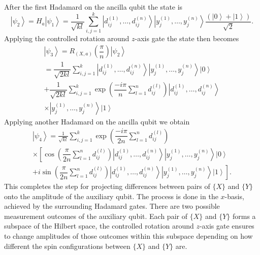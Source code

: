 \documentclass[pra,showkeys,twocolumn,showpacs]{revtex4-1}
\begin{document}
After the first Hadamard on the ancilla qubit the state is
%
\begin{equation}
    \left| \psi_2 \right\rangle = H_a\left| \psi_1 \right\rangle = 
    \frac{1}{\sqrt{kl}}\sum\limits_{i, j=1}^{k} 
    \left| d^{(1)}_{ij}, \dots, d^{(n)}_{ij} \right\rangle 
    \left| y^{(1)}_j, \dots, y^{(n)}_j \right\rangle
    \dfrac{(\left| 0 \right\rangle + \left| 1 \right\rangle)}{\sqrt{2}}  .
\end{equation}
%
Applying the controlled rotation around $z$-axis gate the state then becomes
%
\begin{multline}
    \left| \psi_3 \right\rangle = R_{(X,a)}\left(\dfrac{\pi}{n}\right)\left| \psi_2 \right\rangle
    \\ = \dfrac{1}{\sqrt{2kl}}
				\sum\limits_{i, j=1}^{k} 
				\left| d^{(1)}_{ij}, \dots, d^{(n)}_{ij} \right\rangle 
        \left| y^{(1)}_j, \dots, y^{(n)}_j \right\rangle 
        \left| 0 \right\rangle
        \\ + \dfrac{1}{\sqrt{2kl}}
				\sum\limits_{i, j=1}^{k}
        \exp\left(\dfrac{-i \pi}{n}\sum\limits_{l=1}^n d^{(l)}_{ij} \right)
        \left| d^{(1)}_{ij}, \dots, d^{(n)}_{ij} \right\rangle 
\\ \times        \left| y^{(1)}_j, \dots, y^{(n)}_j \right\rangle 
        \left| 1 \right\rangle
\end{multline}
%
Applying another Hadamard on the ancilla qubit we obtain
%
\begin{multline}
    \left| \psi_4 \right\rangle = 
    \frac{1}{\sqrt{kl}}\sum\limits_{i, j=1}^{k} 
    \exp \left(\dfrac{-i \pi}{2n}\sum\limits_{l=1}^n d^{(l)}_{ij} \right)
		\\ \times
        \left[ \cos\left(\dfrac{\pi}{2n}\sum\limits_{l=1}^n d^{(l)}_{ij} \right)
        \left| d^{(1)}_{ij}, \dots, d^{(n)}_{ij} \right\rangle 
        \left| y^{(1)}_j, \dots, y^{(n)}_j \right\rangle 
        \left| 0 \right\rangle\right.
        \\+ 
        \left. i \sin\left(\dfrac{\pi}{2n}\sum\limits_{l=1}^n d^{(l)}_{ij} \right)
        \left| d^{(1)}_{ij}, \dots, d^{(n)}_{ij} \right\rangle 
        \left| y^{(1)}_j, \dots, y^{(n)}_j \right\rangle 
        \left| 1 \right\rangle\right] .
\end{multline}
%
This completes the step for projecting differences between pairs of $\{X\}$ and $\{Y\}$ onto the amplitude of the auxiliary qubit. 
The process is done in the $x$-basis, achieved by the surrounding Hadamard gates. 
There are two possible measurement outcomes of the auxiliary qubit.  
Each pair of $\{X\}$ and $\{Y\}$ forms a subspace of the Hilbert space, 
the controlled rotation around $z$-axis gate ensures to change amplitudes of those outcomes within this subspace depending on how different the spin configurations between $\{X\}$ and $\{Y\}$ are.
\end{document}
